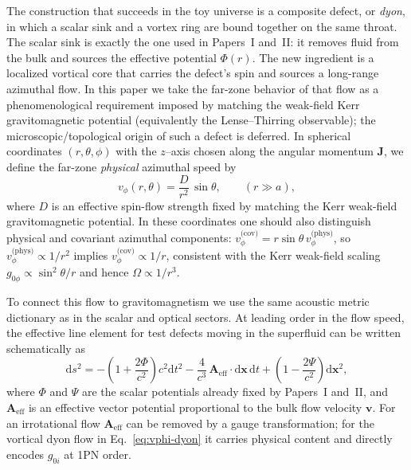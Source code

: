 \documentclass[11pt]{article}
\newcommand{\dd}{\mathrm{d}}
\begin{document}
The construction that succeeds in the toy universe is a composite
defect, or \emph{dyon}, in which a scalar sink and a vortex ring are
bound together on the same throat.
The scalar sink is exactly the one used in Papers~I and~II: it
removes fluid from the bulk and sources the effective potential
$\Phi(r)$.
The new ingredient is a localized vortical core that carries the
defect's spin and sources a long-range azimuthal flow.
In this paper we take the far-zone behavior of that flow as a
phenomenological requirement imposed by matching the weak-field Kerr
gravitomagnetic potential (equivalently the Lense--Thirring observable);
the microscopic/topological origin of such a defect is deferred.
In spherical coordinates $(r,\theta,\phi)$ with the $z$–axis chosen
along the angular momentum $\mathbf{J}$, we define the far-zone
\emph{physical} azimuthal speed by
\begin{equation}
  v_\phi(r,\theta)
  = \frac{D}{r^2}\,\sin\theta,
  \qquad (r\gg a),
  \label{eq:vphi-dyon}
\end{equation}
where $D$ is an effective spin-flow strength fixed by matching the Kerr
weak-field gravitomagnetic potential.
In these coordinates one should also distinguish physical and covariant
azimuthal components: $v_{\phi}^{\text{(cov)}} = r\sin\theta\,
v_{\phi}^{\text{(phys)}}$, so $v_\phi^{\text{(phys)}}\propto 1/r^2$
implies $v_{\phi}^{\text{(cov)}}\propto 1/r$, consistent with the Kerr
weak-field scaling $g_{0\phi}\propto \sin^2\theta/r$ and hence
$\Omega\propto 1/r^3$.

To connect this flow to gravitomagnetism we use the same acoustic
metric dictionary as in the scalar and optical sectors.
At leading order in the flow speed, the effective line element for
test defects moving in the superfluid can be written schematically as
\begin{equation}
  \dd s^2
  = -\left(1 + \frac{2\Phi}{c^2}\right)c^2 \dd t^2
    - \frac{4}{c^3}\,\mathbf{A}_{\text{eff}}\cdot\dd\mathbf{x}\,\dd t
    + \left(1 - \frac{2\Psi}{c^2}\right)\dd\mathbf{x}^2,
  \label{eq:acoustic-metric}
\end{equation}
where $\Phi$ and $\Psi$ are the scalar potentials already fixed by
Papers~I and~II, and $\mathbf{A}_{\text{eff}}$ is an effective vector
potential proportional to the bulk flow velocity $\mathbf{v}$.
For an irrotational flow $\mathbf{A}_{\text{eff}}$ can be removed by
a gauge transformation; for the vortical dyon flow in
Eq.~\eqref{eq:vphi-dyon} it carries physical content and directly
encodes $g_{0i}$ at 1PN order.
\end{document}

